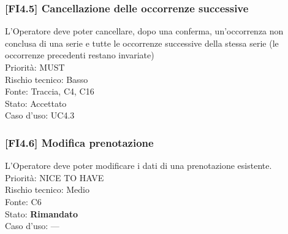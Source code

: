 \subsubsection{[FI4.5] Cancellazione delle occorrenze successive}
L'Operatore deve poter cancellare, dopo una conferma, un'occorrenza non conclusa di una serie e tutte le occorrenze successive della stessa serie (le occorrenze precedenti restano invariate)\\
Priorità: MUST\\Rischio tecnico: Basso\\Fonte: Traccia, C4, C16\\Stato: Accettato\\Caso d'uso: UC4.3

\subsubsection{[FI4.6] Modifica prenotazione}
L'Operatore deve poter modificare i dati di una prenotazione esistente.\\
Priorità: NICE TO HAVE\\Rischio tecnico: Medio\\Fonte: C6\\Stato: \textbf{Rimandato}\\Caso d'uso: —
